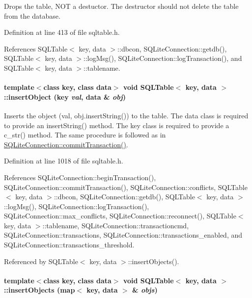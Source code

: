 Drops the table, NOT a destuctor. The destructor should not delete the table from the database. 

Definition at line 413 of file sqltable.h.

References SQLTable$<$ key, data $>$::dbcon, SQLite\-Connection::getdb(), SQLTable$<$ key, data $>$::log\-Msg(), SQLite\-Connection::log\-Transaction(), and SQLTable$<$ key, data $>$::tablename.\hypertarget{classSQLTable_SQLTablea18}{
\paragraph[insertObject]{\setlength{\rightskip}{0pt plus 5cm}template$<$class key, class data$>$ void SQLTable$<$ key, data $>$::insert\-Object (key {\em val}, data \& {\em obj})}\hfill}
\label{classSQLTable_SQLTablea18}


Inserts the object (val, obj.insert\-String()) to the table. The data class is required to provide an insert\-String() method. The key class is required to provide a c\_\-str() method. The same procedure is followed as in \hyperlink{classSQLiteConnection_SQLiteConnectiona7}{SQLite\-Connection::commit\-Transaction()}. 

Definition at line 1018 of file sqltable.h.

References SQLite\-Connection::begin\-Transaction(), SQLite\-Connection::commit\-Transaction(), SQLite\-Connection::conflicts, SQLTable$<$ key, data $>$::dbcon, SQLite\-Connection::getdb(), SQLTable$<$ key, data $>$::log\-Msg(), SQLite\-Connection::log\-Transaction(), SQLite\-Connection::max\_\-conflicts, SQLite\-Connection::reconnect(), SQLTable$<$ key, data $>$::tablename, SQLite\-Connection::transactioncmd, SQLite\-Connection::transactions, SQLite\-Connection::transactions\_\-enabled, and SQLite\-Connection::transactions\_\-threshold.

Referenced by SQLTable$<$ key, data $>$::insert\-Objects().\hypertarget{classSQLTable_SQLTablea19}{
\paragraph[insertObjects]{\setlength{\rightskip}{0pt plus 5cm}template$<$class key, class data$>$ void SQLTable$<$ key, data $>$::insert\-Objects (map$<$ key, data $>$ \& {\em objs})}\hfill}
\label{classSQLTable_SQLTablea19}


